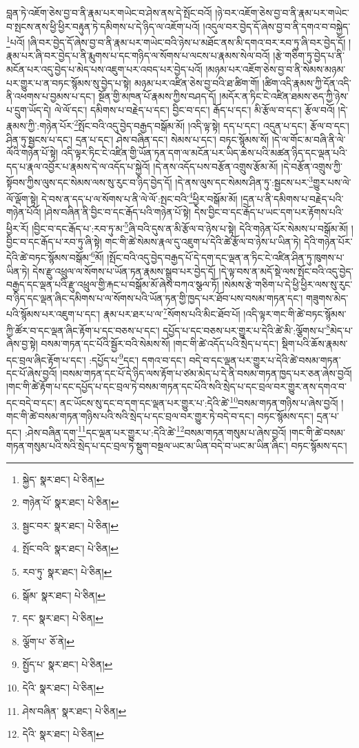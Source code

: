 བླན་ཏེ་འཇོག་ཅེས་བྱ་བ་ནི་རྣམ་པར་གཡེང་བ་ཤེས་ནས་དེ་སྤོང་བའོ། །ཉེ་བར་འཇོག་ཅེས་བྱ་བ་ནི་རྣམ་པར་གཡེང་བ་སྤངས་ནས་ཕྱི་ཕྱིར་བརྟུན་ཏེ་དམིགས་པ་དེ་ཉིད་ལ་འཇོག་པའོ། །འདུལ་བར་བྱེད་དོ་ཞེས་བྱ་བ་ནི་དགའ་བ་བསྐྱེད་\footnote{སྐྱེད་  སྣར་ཐང་།  པེ་ཅིན། }པའོ། །ཞི་བར་བྱེད་དོ་ཞེས་བྱ་བ་ནི་རྣམ་པར་གཡེང་བའི་ཉེས་པ་མཐོང་ནས་མི་དགའ་བར་རབ་ཏུ་ཞི་བར་བྱེད་དོ། །རྣམ་པར་ཞི་བར་བྱེད་པ་ནི་རྨུགས་པ་དང་གཉིད་ལ་སོགས་པ་ལངས་པ་རྣམས་སེལ་བའོ། །རྩེ་གཅིག་ཏུ་བྱེད་པ་ནི་མངོན་པར་འདུ་བྱེད་པ་མེད་པས་འཇུག་པར་འབད་པར་བྱེད་པའོ། །མཉམ་པར་འཇོག་ཅེས་བྱ་བ་ནི་སེམས་མཉམ་པར་གྱུར་པ་ན་བཏང་སྙོམས་སུ་བྱེད་པ་སྟེ། མཉམ་པར་འཛིན་ཅེས་བྱ་བའི་ཐ་ཚིག་གོ། །ཚིག་འདི་རྣམས་ཀྱི་དོན་འདི་ནི་འཕགས་པ་བྱམས་པ་དང་། སྔོན་གྱི་མཁན་པོ་རྣམས་ཀྱིས་བཤད་དོ། །མདོར་ན་ཏིང་ངེ་འཛིན་ཐམས་ཅད་ཀྱི་ཉེས་པ་དྲུག་ཡོད་དེ། ལེ་ལོ་དང་། དམིགས་པ་བརྗེད་པ་དང་། བྱིང་བ་དང་། རྒོད་པ་དང་། མི་རྩོལ་བ་དང་། རྩོལ་བའོ། །དེ་རྣམས་ཀྱི་:གཉེན་པོར་\footnote{གཉེན་པོ་  སྣར་ཐང་།  པེ་ཅིན། }སྤོང་བའི་འདུ་བྱེད་བརྒྱད་བསྒོམ་མོ། །འདི་ལྟ་སྟེ། དད་པ་དང་། འདུན་པ་དང་། རྩོལ་བ་དང་། ཤིན་ཏུ་སྦྱངས་པ་དང་། དྲན་པ་དང་། ཤེས་བཞིན་དང་། སེམས་པ་དང་། བཏང་སྙོམས་སོ། །དེ་ལ་གོང་མ་བཞི་ནི་ལེ་ལོའི་གཉེན་པོ་སྟེ། འདི་ལྟར་ཏིང་ངེ་འཛིན་གྱི་ཡོན་ཏན་དག་ལ་མངོན་པར་ཡིད་ཆེས་པའི་མཚན་ཉིད་དང་ལྡན་པའི་དད་པ་རྣལ་འབྱོར་པ་རྣམས་དེ་ལ་འདོད་པ་སྐྱེའོ། །དེ་ནས་འདོད་པས་བརྩོན་འགྲུས་རྩོམ་མོ། །དེ་བརྩོན་འགྲུས་ཀྱི་སྟོབས་ཀྱིས་ལུས་དང་སེམས་ལས་སུ་རུང་བ་ཉིད་བྱེད་དོ། །དེ་ནས་ལུས་དང་སེམས་ཤིན་ཏུ་:སྦྱངས་པར་\footnote{སྦྱང་བར་  སྣར་ཐང་།  པེ་ཅིན། }གྱུར་པས་ལེ་ལོ་ལྡོག་སྟེ། དེ་བས་ན་དད་པ་ལ་སོགས་པ་ནི་ལེ་ལོ་:སྤང་བའི་\footnote{སྤོང་བའི་  སྣར་ཐང་།  པེ་ཅིན། }ཕྱིར་བསྒོམ་མོ། །དྲན་པ་ནི་དམིགས་པ་བརྗེད་པའི་གཉེན་པོའོ། །ཤེས་བཞིན་ནི་བྱིང་བ་དང་རྒོད་པའི་གཉེན་པོ་སྟེ། དེས་བྱིང་བ་དང་རྒོད་པ་ཡང་དག་པར་རྟོགས་པའི་ཕྱིར་རོ། །བྱིང་བ་དང་རྒོད་པ་:རབ་ཏུ་མ་\footnote{རབ་ཏུ་  སྣར་ཐང་།  པེ་ཅིན། }ཞི་བའི་དུས་ན་མི་རྩོལ་བ་ཉེས་པ་སྟེ། དེའི་གཉེན་པོར་སེམས་པ་བསྒོམ་མོ། །བྱིང་བ་དང་རྒོད་པ་རབ་ཏུ་ཞི་སྟེ། གང་གི་ཚེ་སེམས་རྣལ་དུ་འཇུག་པ་དེའི་ཚེ་རྩོལ་བ་ཉེས་པ་ཡིན་ཏེ། དེའི་གཉེན་པོར་དེའི་ཚེ་བཏང་སྙོམས་བསྒོམ་\footnote{སྒོམ་  སྣར་ཐང་།  པེ་ཅིན། }མོ། །སྤོང་བའི་འདུ་བྱེད་བརྒྱད་པོ་དེ་དག་དང་ལྡན་ན་ཏིང་ངེ་འཛིན་ཤིན་ཏུ་ཁུགས་པ་ཡིན་ཏེ། དེས་རྫུ་འཕྲུལ་ལ་སོགས་པ་ཡོན་ཏན་རྣམས་སྒྲུབ་པར་བྱེད་དོ། །དེ་ལྟ་བས་ན་མདོ་སྡེ་ལས་སྤོང་བའི་འདུ་བྱེད་བརྒྱད་དང་ལྡན་པའི་རྫུ་འཕྲུལ་གྱི་རྐང་པ་བསྒོམ་མོ་ཞེས་བཀའ་སྩལ་ཏོ། །སེམས་རྩེ་གཅིག་པ་དེ་ཕྱི་ཕྱིར་ལས་སུ་རུང་བ་ཉིད་དང་ལྡན་ཞིང་དམིགས་པ་ལ་སོགས་པའི་ཡོན་ཏན་གྱི་ཁྱད་པར་ཐོབ་པས་བསམ་གཏན་དང་། གཟུགས་མེད་པའི་སྙོམས་པར་འཇུག་པ་དང་། རྣམ་པར་ཐར་པ་ལ་\footnote{དང་  སྣར་ཐང་།  པེ་ཅིན། }སོགས་པའི་མིང་ཐོབ་པོ། །འདི་ལྟར་གང་གི་ཚེ་བཏང་སྙོམས་ཀྱི་ཚོར་བ་དང་ལྡན་ཞིང་རྟོག་པ་དང་བཅས་པ་དང་། དཔྱོད་པ་དང་བཅས་པར་གྱུར་པ་དེའི་ཚེ་མི་:ལྕོགས་པ་\footnote{ལྕོག་པ་  ཅོ་ནེ། }མེད་པ་ཞེས་བྱ་སྟེ། བསམ་གཏན་དང་པོའི་སྦྱོར་བའི་སེམས་སོ། །གང་གི་ཚེ་འདོད་པའི་སྲེད་པ་དང་། སྡིག་པའི་ཆོས་རྣམས་དང་བྲལ་ཞིང་རྟོག་པ་དང་། :དཔྱོད་པ་\footnote{སྤྱོད་པ་  སྣར་ཐང་།  པེ་ཅིན། }དང་། དགའ་བ་དང་། བདེ་བ་དང་ལྡན་པར་གྱུར་པ་དེའི་ཚེ་བསམ་གཏན་དང་པོ་ཞེས་བྱའོ། །བསམ་གཏན་དང་པོ་དེ་ཉིད་ལས་རྟོག་པ་ཙམ་མེད་པ་དེ་ནི་བསམ་གཏན་ཁྱད་པར་ཅན་ཞེས་བྱའོ། །གང་གི་ཚེ་རྟོག་པ་དང་དཔྱོད་པ་དང་བྲལ་ཏེ་བསམ་གཏན་དང་པོའི་སའི་སྲེད་པ་དང་བྲལ་བར་གྱུར་ནས་དགའ་བ་དང་བདེ་བ་དང་། ནང་ཡོངས་སུ་དང་བ་དག་དང་ལྡན་པར་གྱུར་པ་:དེའི་ཚེ་\footnote{དེའི་  སྣར་ཐང་།  པེ་ཅིན། }བསམ་གཏན་གཉིས་པ་ཞེས་བྱའོ། །གང་གི་ཚེ་བསམ་གཏན་གཉིས་པའི་སའི་སྲེད་པ་དང་བྲལ་བར་གྱུར་ཏེ་བདེ་བ་དང་། བཏང་སྙོམས་དང་། དྲན་པ་དང་། :ཤེས་བཞིན་དག་\footnote{ཤེས་བཞིན་  སྣར་ཐང་།  པེ་ཅིན། }དང་ལྡན་པར་གྱུར་པ་:དེའི་ཚེ་\footnote{དེའི་  སྣར་ཐང་།  པེ་ཅིན། }བསམ་གཏན་གསུམ་པ་ཞེས་བྱའོ། །གང་གི་ཚེ་བསམ་གཏན་གསུམ་པའི་སའི་སྲེད་པ་དང་བྲལ་ཏེ་སྡུག་བསྔལ་ཡང་མ་ཡིན་བདེ་བ་ཡང་མ་ཡིན་ཞིང་། བཏང་སྙོམས་དང་། 